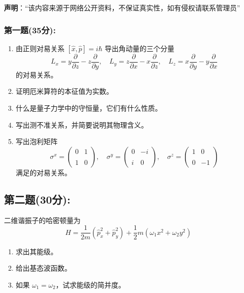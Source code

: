 
\textbf{声明}：“该内容来源于网络公开资料，不保证真实性，如有侵权请联系管理员”

\subsubsection{第一题(35分):}
\begin{enumerate}
    \item 由正则对易关系 $[\hat{x}, \hat{p}] = i\hbar$ 导出角动量的三个分量
    \[    L_x = y \frac{\partial}{\partial z} - z \frac{\partial}{\partial y}, \quad L_y = z \frac{\partial}{\partial x} - x \frac{\partial}{\partial z}, \quad L_z = x \frac{\partial}{\partial y} - y \frac{\partial}{\partial x}~\]
    的对易关系。
    
    \item 证明厄米算符的本征值为实数。
    
    \item 什么是量子力学中的守恒量，它们有什么性质。
    
    \item 写出测不准关系，并简要说明其物理含义。
    
    \item 写出泡利矩阵
    \[    \sigma^x =     \begin{pmatrix}    0 & 1 \\\\    1 & 0    \end{pmatrix},    \quad    \sigma^y =     \begin{pmatrix}    0 & -i \\\\    i & 0    \end{pmatrix},    \quad    \sigma^z =     \begin{pmatrix}    1 & 0 \\\\    0 & -1    \end{pmatrix} ~\]
    满足的对易关系。
\end{enumerate}
\subsection{第二题(30分):}
二维谐振子的哈密顿量为
\[H = \frac{1}{2m} \left( \hat{p}_x^2 + \hat{p}_y^2 \right) + \frac{1}{2} m \left( \omega_1 x^2 + \omega_2 y^2 \right)~\]

\begin{enumerate}
    \item 求出其能级。
    
    \item 给出基态波函数。
    
    \item 如果 $\omega_1 = \omega_2$，试求能级的简并度。
\end{enumerate}

